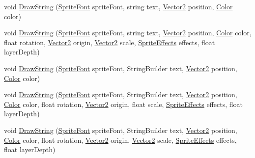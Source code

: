 \begin{DoxyCompactItemize}
\item 
void \hyperlink{classMicrosoft_1_1Xna_1_1Framework_1_1Graphics_1_1SpriteBatch_a4d7b93c9abb0547be094c892774059bc}{Draw\+String} (\hyperlink{classMicrosoft_1_1Xna_1_1Framework_1_1Graphics_1_1SpriteFont}{Sprite\+Font} sprite\+Font, string text, \hyperlink{structMicrosoft_1_1Xna_1_1Framework_1_1Vector2}{Vector2} position, \hyperlink{structMicrosoft_1_1Xna_1_1Framework_1_1Color}{Color} color)
\item 
void \hyperlink{classMicrosoft_1_1Xna_1_1Framework_1_1Graphics_1_1SpriteBatch_ab16bbda3afff3567356374d9d92668ff}{Draw\+String} (\hyperlink{classMicrosoft_1_1Xna_1_1Framework_1_1Graphics_1_1SpriteFont}{Sprite\+Font} sprite\+Font, string text, \hyperlink{structMicrosoft_1_1Xna_1_1Framework_1_1Vector2}{Vector2} position, \hyperlink{structMicrosoft_1_1Xna_1_1Framework_1_1Color}{Color} color, float rotation, \hyperlink{structMicrosoft_1_1Xna_1_1Framework_1_1Vector2}{Vector2} origin, \hyperlink{structMicrosoft_1_1Xna_1_1Framework_1_1Vector2}{Vector2} scale, \hyperlink{namespaceMicrosoft_1_1Xna_1_1Framework_1_1Graphics_a9c011e39366ab61b935b8a1d5ad3b137}{Sprite\+Effects} effects, float layer\+Depth)
\item 
void \hyperlink{classMicrosoft_1_1Xna_1_1Framework_1_1Graphics_1_1SpriteBatch_a595b184dace039d1e3d3e33be6a8121b}{Draw\+String} (\hyperlink{classMicrosoft_1_1Xna_1_1Framework_1_1Graphics_1_1SpriteFont}{Sprite\+Font} sprite\+Font, String\+Builder text, \hyperlink{structMicrosoft_1_1Xna_1_1Framework_1_1Vector2}{Vector2} position, \hyperlink{structMicrosoft_1_1Xna_1_1Framework_1_1Color}{Color} color)
\item 
void \hyperlink{classMicrosoft_1_1Xna_1_1Framework_1_1Graphics_1_1SpriteBatch_ae4247dc37d6753e22a9ed1384905b193}{Draw\+String} (\hyperlink{classMicrosoft_1_1Xna_1_1Framework_1_1Graphics_1_1SpriteFont}{Sprite\+Font} sprite\+Font, String\+Builder text, \hyperlink{structMicrosoft_1_1Xna_1_1Framework_1_1Vector2}{Vector2} position, \hyperlink{structMicrosoft_1_1Xna_1_1Framework_1_1Color}{Color} color, float rotation, \hyperlink{structMicrosoft_1_1Xna_1_1Framework_1_1Vector2}{Vector2} origin, float scale, \hyperlink{namespaceMicrosoft_1_1Xna_1_1Framework_1_1Graphics_a9c011e39366ab61b935b8a1d5ad3b137}{Sprite\+Effects} effects, float layer\+Depth)
\item 
void \hyperlink{classMicrosoft_1_1Xna_1_1Framework_1_1Graphics_1_1SpriteBatch_a6d3619f89f033fdc7baa38d553548740}{Draw\+String} (\hyperlink{classMicrosoft_1_1Xna_1_1Framework_1_1Graphics_1_1SpriteFont}{Sprite\+Font} sprite\+Font, String\+Builder text, \hyperlink{structMicrosoft_1_1Xna_1_1Framework_1_1Vector2}{Vector2} position, \hyperlink{structMicrosoft_1_1Xna_1_1Framework_1_1Color}{Color} color, float rotation, \hyperlink{structMicrosoft_1_1Xna_1_1Framework_1_1Vector2}{Vector2} origin, \hyperlink{structMicrosoft_1_1Xna_1_1Framework_1_1Vector2}{Vector2} scale, \hyperlink{namespaceMicrosoft_1_1Xna_1_1Framework_1_1Graphics_a9c011e39366ab61b935b8a1d5ad3b137}{Sprite\+Effects} effects, float layer\+Depth)

\end{DoxyCompactItemize}
